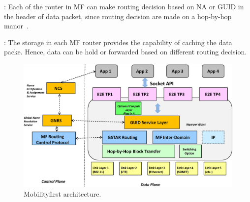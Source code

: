 \vspace{1mm}: Each of the router in MF can make routing decision based on NA or GUID in the header of data packet, since routing decision are made on a hop-by-hop manor~\cite{nelson2011gstar}.

\vspace{1mm}: The storage in each MF router provides the capability of caching the data packe. Hence, data can be hold or forwarded based on different routing decision.
\begin{figure}
\centering
\includegraphics[width=\columnwidth]{figure/mf_arch.eps}
\caption{\label{fig:mf_arch}Mobilityfirst architecture.}
\end{figure}
